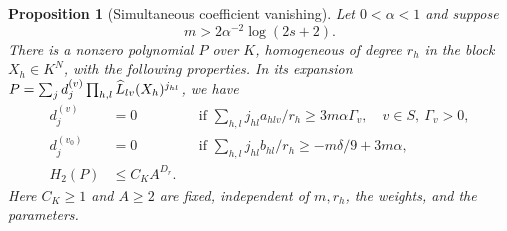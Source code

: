 \documentclass[11pt]{article}
\numberwithin{equation}{section}
\newtheorem{proposition}[theorem]{Proposition}
\theoremstyle{remark}\newtheorem{remark}[theorem]{Remark}
\begin{document}
\begin{proposition}[Simultaneous coefficient vanishing]\label{prop:auxiliary}
Let $0<\alpha<1$ and suppose
\begin{equation}\label{eq:mcondition}
 m>2\alpha^{-2}\log(2s+2).
\end{equation}
There is a nonzero polynomial $P$ over $K$, homogeneous of degree
$r_h$ in the block $X_h\in K^N$, with the following properties.
In its expansion
$P=\sum_jd^{(v)}_j\prod_{h,l}\widehat L_{lv}(X_h)^{j_{hl}}$, we have
\begin{align}
 d^{(v)}_j&=0 &&\text{if }\sum_{h,l}j_{hl}a_{hlv}/r_h\ge3m\alpha\Gamma_v,
       \quad v\in S,\ \Gamma_v>0,\label{eq:vanishordinary}\\
 d^{(v_0)}_j&=0 &&\text{if }\sum_{h,l}j_{hl}b_{hl}/r_h
                          \ge-m\delta/9+3m\alpha,\label{eq:vanishspecial}\\
 H_2(P)&\le C_K A^{D_r}.&&\label{eq:polyheight}
\end{align}
Here $C_K\ge1$ and $A\ge2$ are fixed, independent of $m,r_h$,
the weights, and the parameters.
\end{proposition}
\end{document}
